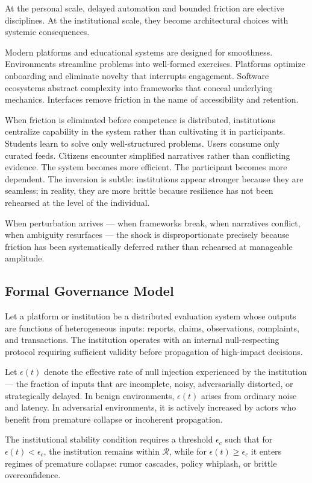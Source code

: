 \documentclass[11pt]{article}
\theoremstyle{remark}
\begin{document}
At the personal scale, delayed automation and bounded friction are elective disciplines. At the institutional scale, they become architectural choices with systemic consequences.

Modern platforms and educational systems are designed for smoothness. Environments streamline problems into well-formed exercises. Platforms optimize onboarding and eliminate novelty that interrupts engagement. Software ecosystems abstract complexity into frameworks that conceal underlying mechanics. Interfaces remove friction in the name of accessibility and retention.

When friction is eliminated before competence is distributed, institutions centralize capability in the system rather than cultivating it in participants. Students learn to solve only well-structured problems. Users consume only curated feeds. Citizens encounter simplified narratives rather than conflicting evidence. The system becomes more efficient. The participant becomes more dependent. The inversion is subtle: institutions appear stronger because they are seamless; in reality, they are more brittle because resilience has not been rehearsed at the level of the individual.

When perturbation arrives --- when frameworks break, when narratives conflict, when ambiguity resurfaces --- the shock is disproportionate precisely because friction has been systematically deferred rather than rehearsed at manageable amplitude.

\subsection{Formal Governance Model}

Let a platform or institution be a distributed evaluation system whose outputs are functions of heterogeneous inputs: reports, claims, observations, complaints, and transactions. The institution operates with an internal null-respecting protocol requiring sufficient validity before propagation of high-impact decisions.

Let $\epsilon(t)$ denote the effective rate of null injection experienced by the institution --- the fraction of inputs that are incomplete, noisy, adversarially distorted, or strategically delayed. In benign environments, $\epsilon(t)$ arises from ordinary noise and latency. In adversarial environments, it is actively increased by actors who benefit from premature collapse or incoherent propagation.

The institutional stability condition requires a threshold $\epsilon_c$ such that for $\epsilon(t) < \epsilon_c$, the institution remains within $\mathcal{R}$, while for $\epsilon(t) \geq \epsilon_c$ it enters regimes of premature collapse: rumor cascades, policy whiplash, or brittle overconfidence.
\end{document}
